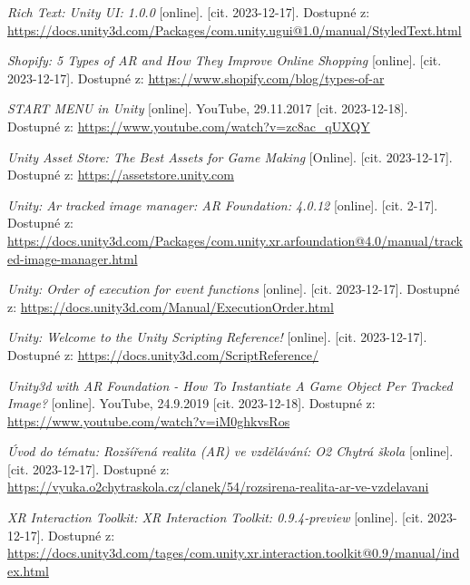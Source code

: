 \documentclass[12pt, a4paper,
twoside,        %
openright
]{report}
\begin{document}
\begin{thebibliography}{99}
\textit{Rich Text: Unity UI: 1.0.0} [online]. [cit. 2023-12-17]. Dostupné z: \url{https://docs.unity3d.com/Packages/com.unity.ugui@1.0/manual/StyledText.html}

\textit{Shopify: 5 Types of AR and How They Improve Online Shopping} [online]. [cit. 2023-12-17]. Dostupné z: \url{https://www.shopify.com/blog/types-of-ar}	

 \textit{START MENU in Unity} [online]. YouTube, 29.11.2017 [cit. 2023-12-18]. Dostupné z: \url{https://www.youtube.com/watch?v=zc8ac_qUXQY}

\textit{Unity Asset Store: The Best Assets for Game Making} [Online]. [cit. 2023-12-17]. Dostupné z: \url{https://assetstore.unity.com}

\textit{Unity: Ar tracked image manager: AR Foundation: 4.0.12} [online]. [cit. 2-17]. Dostupné z: \url{https://docs.unity3d.com/Packages/com.unity.xr.arfoundation@4.0/manual/tracked-image-manager.html}

\textit{Unity: Order of execution for event functions} [online]. [cit. 2023-12-17]. Dostupné z: \url{https://docs.unity3d.com/Manual/ExecutionOrder.html}

\textit{Unity: Welcome to the Unity Scripting Reference!} [online]. [cit. 2023-12-17]. Dostupné z: \url{https://docs.unity3d.com/ScriptReference/}

 \textit{Unity3d with AR Foundation - How To Instantiate A Game Object Per Tracked Image?} [online]. YouTube, 24.9.2019 [cit. 2023-12-18]. Dostupné z: \url{https://www.youtube.com/watch?v=iM0ghkvsRos}

\textit{Úvod do tématu: Rozšířená realita (AR) ve vzdělávání: O2 Chytrá škola} [online]. [cit. 2023-12-17]. Dostupné z: \url{https://vyuka.o2chytraskola.cz/clanek/54/rozsirena-realita-ar-ve-vzdelavani}

\textit{XR Interaction Toolkit: XR Interaction Toolkit: 0.9.4-preview} [online]. [cit. 2023-12-17]. Dostupné z: \url{https://docs.unity3d.com/tages/com.unity.xr.interaction.toolkit@0.9/manual/index.html}



\end{thebibliography}

\listoffigures

\appendix %
\end{document}
